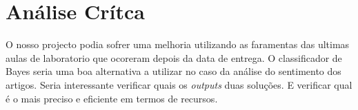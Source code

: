 \section{Análise Crítca}
\hspace{15pt}O nosso projecto podia sofrer uma melhoria utilizando as faramentas das ultimas aulas de laboratorio que ocoreram depois da data de entrega. O classificador de Bayes seria uma boa alternativa a utilizar no caso da análise do sentimento dos artigos. Seria interessante verificar quais os \textit{outputs} duas soluções. E verificar qual é o mais preciso e eficiente em termos de recursos. 